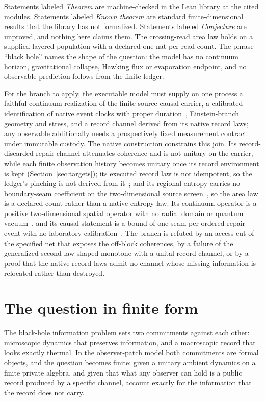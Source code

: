\documentclass[11pt]{article}
\theoremstyle{remark}
\begin{document}
Statements labeled \emph{Theorem} are machine-checked in the Lean library at
the cited modules. Statements labeled \emph{Known theorem} are standard
finite-dimensional results that the library has not formalized. Statements
labeled \emph{Conjecture} are unproved, and nothing here claims them. The
crossing-read area law holds on a supplied layered population with a
declared one-nat-per-read count. The phrase ``black hole'' names the shape
of the question: the model has no continuum horizon, gravitational collapse,
Hawking flux or evaporation endpoint, and no observable prediction follows
from the finite ledger.

For the branch to apply, the executable model must supply on one process a
faithful continuum realization of the finite source-causal carrier, a
calibrated identification of native event clocks with proper
duration~\cite{ophmodel}, Einstein-branch geometry and stress, and a record
channel derived from its native record laws; any observable additionally
needs a prospectively fixed measurement contract under immutable custody.
The native construction constrains this join. Its record-discarded repair
channel attenuates coherence and is not unitary on the carrier, while each
finite observation history becomes unitary once its record environment is
kept (Section~\ref{sec:targets}); its executed record law is not idempotent,
so the ledger's pinching is not derived from it~\cite{ophrecordlaws}; and its
regional entropy carries no boundary-seam coefficient on the two-dimensional
source screen~\cite{ophentropy}, so the area law is a declared count rather
than a native entropy law. Its continuum operator is a positive two-dimensional spatial operator
with no radial domain or quantum vacuum~\cite{ophcontinuum,ophtimefields},
and its causal statement is a bound of one seam per ordered repair event
with no laboratory calibration~\cite{ophcausality}.
The branch is refuted by an access cut of the specified net that exposes
the off-block coherences, by a failure of the generalized-second-law-shaped
monotone with a unital record channel, or by a proof that the native record
laws admit no channel whose missing information is relocated rather than
destroyed.

\section{The question in finite form}

The black-hole information problem sets two commitments against each
other: microscopic dynamics that preserves information, and a
macroscopic record that looks exactly thermal. In the observer-patch
model both commitments are formal objects, and the question becomes
finite: given a unitary ambient dynamics on a finite private algebra,
and given that what any observer can hold is a public record
produced by a specific channel, account exactly for the information that
the record does not carry.
\end{document}
